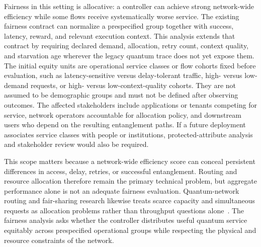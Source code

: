 \documentclass[10pt,conference]{IEEEtran}
\begin{document}
Fairness in this setting is allocative: a controller can achieve strong network-wide efficiency while some flows receive systematically worse service. The existing fairness contract can normalize a prespecified group together with success, latency, reward, and relevant execution context. This analysis extends that contract by requiring declared demand, allocation, retry count, context quality, and starvation age wherever the legacy quantum trace does not yet expose them. The initial equity units are operational service classes or flow cohorts fixed before evaluation, such as latency-sensitive versus delay-tolerant traffic, high- versus low-demand requests, or high- versus low-context-quality cohorts. They are not assumed to be demographic groups and must not be defined after observing outcomes. The affected stakeholders include applications or tenants competing for service, network operators accountable for allocation policy, and downstream users who depend on the resulting entanglement paths. If a future deployment associates service classes with people or institutions, protected-attribute analysis and stakeholder review would also be required.

This scope matters because a network-wide efficiency score can conceal persistent differences in access, delay, retries, or successful entanglement. Routing and resource allocation therefore remain the primary technical problem, but aggregate performance alone is not an adequate fairness evaluation. Quantum-network routing and fair-sharing research likewise treats scarce capacity and simultaneous requests as allocation problems rather than throughput questions alone~\cite{li2021effective,cicconetti2023service}. The fairness analysis asks whether the controller distributes useful quantum service equitably across prespecified operational groups while respecting the physical and resource constraints of the network.
\end{document}
